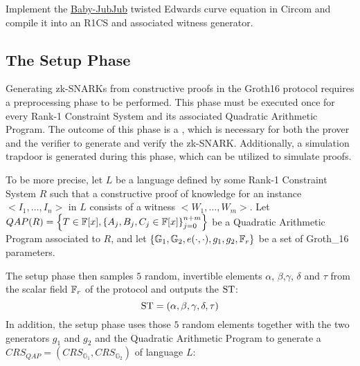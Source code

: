 \begin{exercise}
\label{ex:baby-jubjub-circom} Implement the \href{https://github.com/iden3/iden3-docs/blob/master/source/iden3_repos/research/publications/zkproof-standards-workshop-2/baby-jubjub/baby-jubjub.rst}{Baby-JubJub}  twisted Edwards curve equation in Circom and compile it into an R1CS and associated witness generator.
\end{exercise}

\subsection{The Setup Phase} Generating zk-SNARKs from constructive proofs in the Groth16 protocol requires a preprocessing phase to be performed. This phase must be executed once for every Rank-1 Constraint System and its associated Quadratic Arithmetic Program. The outcome of this phase is a , which is necessary for both the prover and the verifier to generate and verify the zk-SNARK. Additionally, a simulation trapdoor is generated during this phase, which can be utilized to simulate proofs.

To be more precise, let $L$ be a language defined by some Rank-1 Constraint System $R$ such that  a constructive proof of knowledge for an instance $<I_1,\ldots,I_n>$ in $L$ consists of a witness $<W_1,\ldots,W_m>$. Let $QAP(R) = \left\{T\in \mathbb{F}[x],\left\{A_j,B_j,C_j\in \mathbb{F}[x]\right\}_{j=0}^{n+m}\right\}$ be a Quadratic Arithmetic Program associated to $R$, and let $\{\mathbb{G}_1, \mathbb{G}_2, e(\cdot,\cdot), g_1, g_2, \mathbb{F}_r\}$ be a set of Groth\_16 parameters.

The setup phase then samples $5$ random, invertible elements $\alpha$, $\beta$,$\gamma$, $\delta$ and $\tau$ from the scalar field $\mathbb{F}_r$ of the protocol and outputs the  $\mathrm{ST}$:
\begin{equation}
\label{def:groth16-trapdoor}
\mathrm{ST} = (\alpha, \beta, \gamma, \delta, \tau)
\end{equation}
In addition, the setup phase uses those $5$ random elements together with the two generators $g_1$ and $g_2$  and the Quadratic Arithmetic Program to generate a  $CRS_{QAP}= (CRS_{\mathbb{G}_1},CRS_{\mathbb{G}_2})$ of language $L$:

